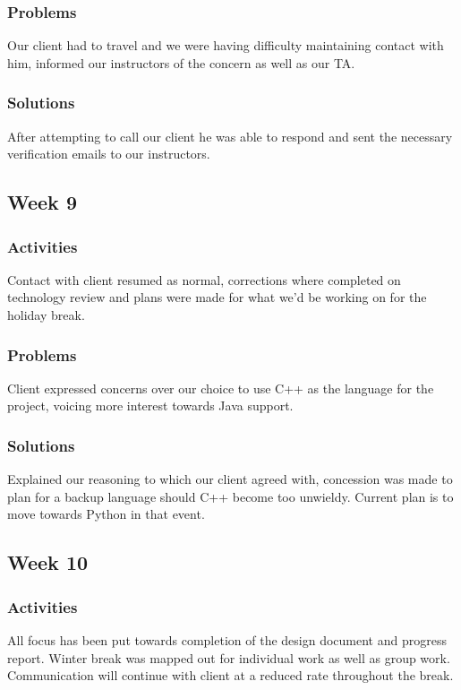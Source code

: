 \documentclass[onecolumn, draftclsnofoot,10pt, compsoc]{IEEEtran}
\begin{document}
\subsubsection{Problems}
Our client had to travel and we were having difficulty maintaining contact with him, informed our instructors of the concern as well as our TA.

\subsubsection{Solutions}
After attempting to call our client he was able to respond and sent the necessary verification emails to our instructors. 

\subsection{Week 9}
\subsubsection{Activities}
Contact with client resumed as normal, corrections where completed on technology review and plans were made for what we’d be working on for the holiday break.

\subsubsection{Problems}
Client expressed concerns over our choice to use C++ as the language for the project, voicing more interest towards Java support.

\subsubsection{Solutions}
Explained our reasoning to which our client agreed with, concession was made to plan for a backup language should C++ become too unwieldy. Current plan is to move towards Python in that event.

\subsection{Week 10}
\subsubsection{Activities}
All focus has been put towards completion of the design document and progress report. Winter break was mapped out for individual work as well as group work. Communication will continue with client at a reduced rate throughout the break.
\end{document}
